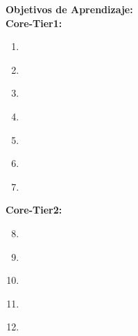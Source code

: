 \noindent \textbf{Objetivos de Aprendizaje:}\\
\noindent \textbf{Core-Tier1:}
\begin{enumerate}
	\setcounter{enumi}{0}
	\item \ALBasicAnalysisLOExplain\xspace[\ALBasicAnalysisLOExplainLevel]\label{sec:BOK:ALBasicAnalysisLOExplain}
	\item \ALBasicAnalysisLOIn\xspace[\ALBasicAnalysisLOInLevel]\label{sec:BOK:ALBasicAnalysisLOIn}
	\item \ALBasicAnalysisLODetermine\xspace[\ALBasicAnalysisLODetermineLevel]\label{sec:BOK:ALBasicAnalysisLODetermine}
	\item \ALBasicAnalysisLOState\xspace[\ALBasicAnalysisLOStateLevel]\label{sec:BOK:ALBasicAnalysisLOState}
	\item \ALBasicAnalysisLOList\xspace[\ALBasicAnalysisLOListLevel]\label{sec:BOK:ALBasicAnalysisLOList}
	\item \ALBasicAnalysisLOPerform\xspace[\ALBasicAnalysisLOPerformLevel]\label{sec:BOK:ALBasicAnalysisLOPerform}
	\item \ALBasicAnalysisLOGive\xspace[\ALBasicAnalysisLOGiveLevel]\label{sec:BOK:ALBasicAnalysisLOGive}
\end{enumerate}
\noindent \textbf{Core-Tier2:}
\begin{enumerate}
	\setcounter{enumi}{7}
	\item \ALBasicAnalysisLOUse\xspace[\ALBasicAnalysisLOUseLevel]\label{sec:BOK:ALBasicAnalysisLOUse}
	\item \ALBasicAnalysisLOUseBig\xspace[\ALBasicAnalysisLOUseBigLevel]\label{sec:BOK:ALBasicAnalysisLOUseBig}
	\item \ALBasicAnalysisLOExplainThe\xspace[\ALBasicAnalysisLOExplainTheLevel]\label{sec:BOK:ALBasicAnalysisLOExplainThe}
	\item \ALBasicAnalysisLOUseRecurrence\xspace[\ALBasicAnalysisLOUseRecurrenceLevel]\label{sec:BOK:ALBasicAnalysisLOUseRecurrence}
	\item \ALBasicAnalysisLOSolve\xspace[\ALBasicAnalysisLOSolveLevel]\label{sec:BOK:ALBasicAnalysisLOSolve}
\end{enumerate}



